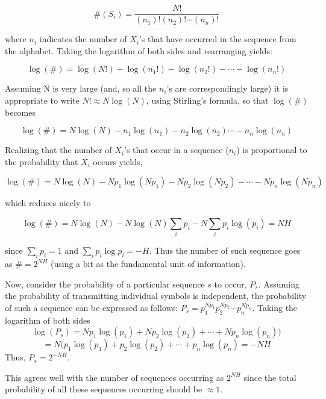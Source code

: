 \documentclass[letterpaper,twoside,10pt]{article}
\begin{document}
%



\appendix
\renewcommand\thesection{Appendix \Alph{section}}
\section{}


 \[ \#(S_i) = \frac{N!}{(n_1)!(n_2)!\cdots(n_n)!} \] 

where $n_i$ indicates the number of $X_i$'s that have occurred in the sequence from the alphabet. Taking the logarithm of both sides and rearranging yields: 

\[\log(\#) = \log(N!)- \log(n_1!)-\log(n_2!)-\cdots-\log(n_n!) \]

Assuming N is very large (and, so all the $n_i$'s are correspondingly large) it is appropriate to write $N!\approx N\log(N)$, using Stirling's formula, so that $\log(\#)$ becomes 

\[\log(\#) = N\log(N)-n_1\log(n_1)-n_2\log(n_2)\cdots-n_n\log(n_n) \]

Realizing that the number of $X_i$'s that occur in a sequence ($n_i$) is proportional to the probability that $X_i$ occurs yields,

\[\log(\#) = N\log(N)-Np_1\log(Np_1)-Np_2\log(Np_2)-\cdots-Np_n\log(Np_n)\]

which reduces nicely to

\[\log(\#)=N\log(N)-N\log(N)\sum_ip_i-N\sum_ip_i\log(p_i) = NH \]

since $\sum_ip_i = 1$ and $\sum_ip_i\log p_i = -H$. Thus the number of such sequence goes as $\# = 2^{NH}$ (using a bit as the fundamental unit of information).

Now, consider the probability of a particular sequence $s$ to occur, $P_s$. Assuming the probability of transmitting individual symbols is independent, the probability of such a sequence can be expressed as follows: $P_s = p_1^{Np_1}p_2^{Np_2}\cdots p_n^{Np_n}$. Taking the logarithm of both sides 
\[
\log(P_s)=Np_1\log(p_1)+Np_2\log(p_2)+\cdots+Np_n\log(p_n))
\]
\[
= N(p_1\log(p_1)+p_2\log(p_2)+\cdots+p_n\log(p_n) = -NH
\]
Thus, $P_s = 2^{-NH}$.

This agrees well with the number of sequences occurring as $2^{NH}$ since the total probability of all these sequences occurring should be $\approx 1$.
\end{document}
